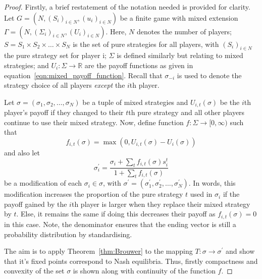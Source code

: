\begin{proof}
    Firstly, a brief restatement of the notation needed is provided for clarity.
    Let \(G=(N, (S_{i})_{i \in N}, (u_{i})_{i \in N})\) be a finite game with
    mixed extension \(\Gamma=(N, (\Sigma_{i})_{i \in N}, (U_{i})_{i \in N})\).
    Here, \(N\) denotes the number of players; \(S = S_{1} \times S_{2} \times
    \ldots \times S_{N}\) is the set of pure strategies for all players, with
    \((S_i)_{i \in N}\) the pure strategy set for player i; \(\Sigma \) is
    defined similarly but relating to mixed strategies; and \(U_{i}: \Sigma \to
    \mathbb{R}\) are the payoff functions as given in
    equation~\ref{eqn:mixed_payoff_function}. Recall that \(\sigma_{-i}\) is
    used to denote the strategy choice of all players \emph{except} the \(i\)th
    player.
    
    Let \(\sigma = (\sigma_{1}, \sigma_{2}, \ldots, \sigma_{N})\) be a tuple of
    mixed strategies and \(U_{i,t}(\sigma)\) be the \(i\)th player's payoff if
    they changed to their \(t\)th pure strategy and all other players continue
    to use their mixed strategy.
    Now, define function \(f: \Sigma \to [0, \infty)\) such that 
    \begin{equation}
        f_{i,t}(\sigma) = \max{(0, U_{i,t}(\sigma)-U_{i}(\sigma))}
    \end{equation}
    and also let 
    \begin{equation}
        \sigma_{i}^{\prime} = \frac{ \sigma_{i}+\sum_{t}{f_{i,t}(\sigma)s_{i}^{t}} }{ 1+\sum_{t}{f_{i,t}(\sigma)} }
    \end{equation}
    be a modification of each \(\sigma_{i} \in \sigma \), with \(\sigma^{\prime}
    = (\sigma_{1}^{\prime}, \sigma_{2}^{\prime}, \ldots, \sigma_{N}^{\prime})\).
    In words, this modification increases the proportion of the pure strategy
    \(t\) used in \(\sigma_{i}\) if the payoff gained by the \(i\)th player is
    larger when they replace their mixed strategy by \(t\). Else, it remains the
    same if doing this decreases their payoff as \(f_{i,t}(\sigma)=0\) in this
    case. Note, the denominator ensures that the ending vector is still a
    probability distribution by standardising.

    The aim is to apply Theorem~\ref{thm:Brouwer} to the mapping \(T: \sigma \to
    \sigma^{\prime}\) and show that it's fixed points correspond to Nash
    equilibria. Thus, firstly compactness and convexity of the set \(\sigma \)
    is shown along with continuity of the function \(f\). 
    

\end{proof}
